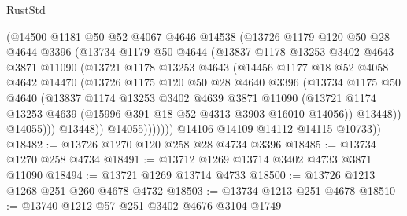 \begin{lexlean}{RustStd}
\begin{coremodule}
                  (@14500
                    @1181
                    @50
                    @52
                    @4067
                    @4646
                    @14538
                    (@13726
                      @1179
                      @120
                      @50
                      @28
                      @4644
                      @3396
                      (@13734
                        @1179
                        @50
                        @4644
                        (@13837
                          @1178
                          @13253
                          @3402
                          @4643
                          @3871
                          @11090
                          (@13721
                            @1178
                            @13253
                            @4643
                            (@14456
                              @1177
                              @18
                              @52
                              @4058
                              @4642
                              @14470
                              (@13726
                                @1175
                                @120
                                @50
                                @28
                                @4640
                                @3396
                                (@13734
                                  @1175
                                  @50
                                  @4640
                                  (@13837
                                    @1174
                                    @13253
                                    @3402
                                    @4639
                                    @3871
                                    @11090
                                    (@13721
                                      @1174
                                      @13253
                                      @4639
                                      (@15996 @391 @18 @52 @4313 @3903 @16010 @14056))
                                    @13448))
                                @14055)))
                          @13448))
                      @14055)))))))
        @14106
        @14109
        @14112
        @14115
        @10733))
@18482 := @13726 @1270 @120 @258 @28 @4734 @3396
@18485 := @13734 @1270 @258 @4734
@18491 := @13712 @1269 @13714 @3402 @4733 @3871 @11090
@18494 := @13721 @1269 @13714 @4733
@18500 := @13726 @1213 @1268 @251 @260 @4678 @4732
@18503 := @13734 @1213 @251 @4678
@18510 := @13740 @1212 @57 @251 @3402 @4676 @3104 @1749

\end{coremodule}
\end{lexlean}
